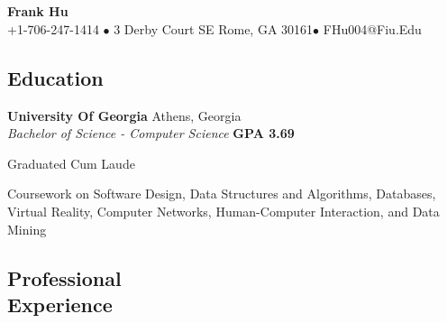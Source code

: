 \documentclass[margin,line]{resume}
\begin{document}
	\section{}
	{\centering \LARGE{\textbf{Frank Hu}}}
	\\
	\normalsize
	+1-706-247-1414 $\bullet$ 3 Derby Court SE Rome, GA 30161$\bullet$ FHu004@Fiu.Edu
	
	\begin{resume}
	
	
	
	\section{\mysidestyle Education}
	
	\textbf{University Of Georgia} Athens, Georgia \vspace{2mm}\\\vspace{1mm}%
	\textsl{Bachelor of Science - Computer Science} \hfill \textbf{GPA 3.69}\vspace{2mm}
	\begin{list2} 
		\item Graduated Cum Laude
		\item Coursework on Software Design, Data Structures and Algorithms, Databases, Virtual Reality, Computer Networks, Human-Computer Interaction, and Data Mining
		
	\section{\mysidestyle Professional\\Experience}
	

\end{list2}
\end{resume}
\end{document}
